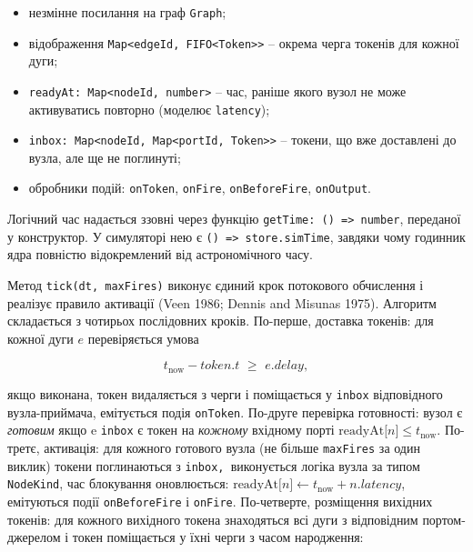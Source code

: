 \documentclass[
]{article}
\begin{document}
\begin{itemize}
\item
  незмінне посилання на граф \texttt{Graph};
\item
  відображення
  \texttt{Map}\texttt{\textless{}}\texttt{edgeId}\texttt{,\ FIFO\textless{}}\texttt{Token}\texttt{\textgreater{}\textgreater{}}
  -- окрема черга токенів для кожної дуги;
\item
  \texttt{readyAt}\texttt{:\ }\texttt{Map}\texttt{\textless{}}\texttt{nodeId}\texttt{,\ }\texttt{number}\texttt{\textgreater{}}
  -- час, раніше якого вузол не може активуватись повторно (моделює
  \texttt{latency});
\item
  \texttt{inbox}\texttt{:\ }\texttt{Map}\texttt{\textless{}}\texttt{nodeId}\texttt{,\ }\texttt{Map}\texttt{\textless{}}\texttt{portId}\texttt{,\ }\texttt{Token}\texttt{\textgreater{}\textgreater{}}
  -- токени, що вже доставлені до вузла, але ще не поглинуті;
\item
  обробники подій: \texttt{onToken}, \texttt{onFire},
  \texttt{onBeforeFire}, \texttt{onOutput}.
\end{itemize}

Логічний час надається ззовні через функцію
\texttt{getTime}\texttt{:\ ()\ =\textgreater{}\ }\texttt{number},
переданої у конструктор. У симуляторі нею є
\texttt{()\ =\textgreater{}\ }\texttt{store.simTime}, завдяки чому
годинник ядра повністю відокремлений від астрономічного часу.

Метод
\texttt{tick}\texttt{(}\texttt{dt}\texttt{,\ }\texttt{maxFires}\texttt{)}
виконує єдиний крок потокового обчислення і реалізує правило активації
(Veen 1986; Dennis and Misunas 1975). Алгоритм складається з чотирьох
послідовних кроків. По-перше, доставка токенів: для кожної дуги \(e\)
перевіряється умова

\[t_{\text{now}} - token.t\mspace{6mu} \geq \mspace{6mu} e.delay,\]

якщо виконана, токен видаляється з черги і поміщається у \texttt{inbox}
відповідного вузла-приймача, емітується подія \texttt{onToken}. По-друге
перевірка готовності: вузол є \emph{готовим} якщо e \texttt{inbox} є
токен на \emph{кожному} вхідному порті
\(\text{readyAt}\lbrack n\rbrack \leq t_{\text{now}}\). По-третє,
активація: для кожного готового вузла (не більше \texttt{maxFires} за
один виклик) токени поглинаються з \texttt{inbox}\texttt{,\ }виконується
логіка вузла за типом \texttt{NodeKind}, час блокування оновлюється:
\(\text{readyAt}\lbrack n\rbrack \leftarrow t_{\text{now}} + n.latency\),
емітуються події \texttt{onBeforeFire} і \texttt{onFire}. По-четверте,
розміщення вихідних токенів: для кожного вихідного токена знаходяться
всі дуги з відповідним портом-джерелом і токен поміщається у їхні черги
з часом народження:
\end{document}
